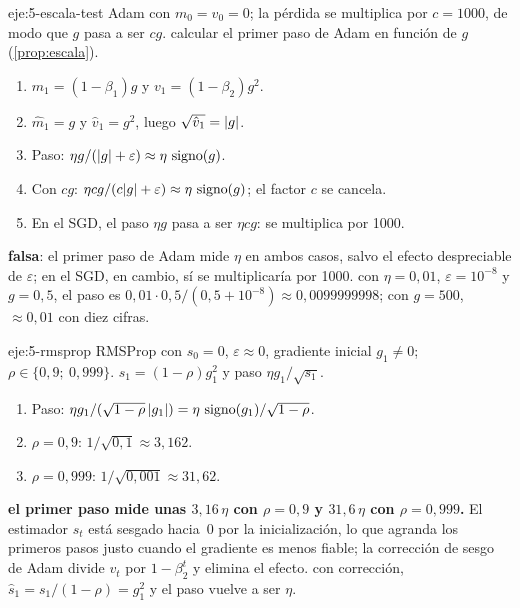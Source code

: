 \begin{solucion}{eje:5-escala-test}
\datos Adam con $m_0=v_0=0$; la pérdida se multiplica por $c=1000$, de modo que $g$ pasa a ser $cg$.
\planteamiento calcular el primer paso de Adam en función de $g$ (\cref{prop:escala}).
\pasos
\begin{enumerate}[label=\arabic*.]
  \item $m_1=(1-\beta_1)g$ y $v_1=(1-\beta_2)g^{2}$.
  \item $\hat m_1=g$ y $\hat v_1=g^{2}$, luego $\sqrt{\hat v_1}=\lvert g\rvert$.
  \item Paso: $\eta g/(\lvert g\rvert+\varepsilon)\approx\eta\,\operatorname{signo}(g)$.
  \item Con $cg$: $\eta cg/(c\lvert g\rvert+\varepsilon)\approx\eta\,\operatorname{signo}(g)$; el factor $c$ se cancela.
  \item En el SGD, el paso $\eta g$ pasa a ser $\eta cg$: se multiplica por 1000.
\end{enumerate}
\resultado \textbf{falsa}: el primer paso de Adam mide $\eta$ en ambos casos, salvo el efecto despreciable de $\varepsilon$; en el SGD, en cambio, sí se multiplicaría por 1000.
\comprobacion con $\eta=0{,}01$, $\varepsilon=10^{-8}$ y $g=0{,}5$, el paso es $0{,}01\cdot 0{,}5/(0{,}5+10^{-8})\approx 0{,}0099999998$; con $g=500$, $\approx 0{,}01$ con diez cifras.
\end{solucion}

\begin{solucion}{eje:5-rmsprop}
\datos RMSProp con $s_0=0$, $\varepsilon\approx 0$, gradiente inicial $g_1\ne 0$; $\rho\in\{0{,}9;\ 0{,}999\}$.
\planteamiento $s_1=(1-\rho)g_1^{2}$ y paso $\eta g_1/\sqrt{s_1}$.
\pasos
\begin{enumerate}[label=\arabic*.]
  \item Paso: $\eta g_1/(\sqrt{1-\rho}\,\lvert g_1\rvert)=\eta\,\operatorname{signo}(g_1)/\sqrt{1-\rho}$.
  \item $\rho=0{,}9$: $1/\sqrt{0{,}1}\approx 3{,}162$.
  \item $\rho=0{,}999$: $1/\sqrt{0{,}001}\approx 31{,}62$.
\end{enumerate}
\resultado \textbf{el primer paso mide unas $3{,}16\,\eta$ con $\rho=0{,}9$ y $31{,}6\,\eta$ con $\rho=0{,}999$.} El estimador $s_t$ está sesgado hacia~0 por la inicialización, lo que agranda los primeros pasos justo cuando el gradiente es menos fiable; la corrección de sesgo de Adam divide $v_t$ por $1-\beta_2^{t}$ y elimina el efecto.
\comprobacion con corrección, $\hat s_1=s_1/(1-\rho)=g_1^{2}$ y el paso vuelve a ser $\eta$.
\end{solucion}

